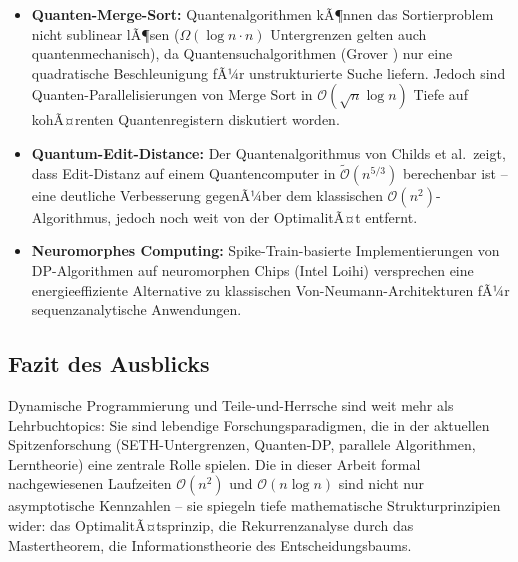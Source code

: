 ﻿\documentclass[a4paper,12pt]{article}
\theoremstyle{definition}
\begin{document}
\begin{itemize}
    \item \textbf{Quanten-Merge-Sort:} Quantenalgorithmen kÃ¶nnen das Sortierproblem
          nicht sublinear lÃ¶sen ($\Omega(\log n \cdot n)$ Untergrenzen gelten auch
          quantenmechanisch), da Quantensuchalgorithmen (Grover \cite{grover1996})
          nur eine quadratische Beschleunigung fÃ¼r unstrukturierte Suche liefern.
          Jedoch sind Quanten-Parallelisierungen von Merge Sort in
          $\mathcal{O}(\sqrt{n} \log n)$ Tiefe auf kohÃ¤renten Quantenregistern
          diskutiert worden.
    \item \textbf{Quantum-Edit-Distance:} Der Quantenalgorithmus von Childs et al.\
          zeigt, dass Edit-Distanz auf einem Quantencomputer in
          $\tilde{\mathcal{O}}(n^{5/3})$ berechenbar ist -- eine deutliche
          Verbesserung gegenÃ¼ber dem klassischen $\mathcal{O}(n^2)$-Algorithmus,
          jedoch noch weit von der OptimalitÃ¤t entfernt.
    \item \textbf{Neuromorphes Computing:} Spike-Train-basierte Implementierungen
          von DP-Algorithmen auf neuromorphen Chips (Intel Loihi) versprechen eine
          energieeffiziente Alternative zu klassischen Von-Neumann-Architekturen
          fÃ¼r sequenzanalytische Anwendungen.
\end{itemize}

\subsection{Fazit des Ausblicks}

Dynamische Programmierung und Teile-und-Herrsche sind weit mehr als Lehrbuchtopics:
Sie sind lebendige Forschungsparadigmen, die in der aktuellen Spitzenforschung
(SETH-Untergrenzen, Quanten-DP, parallele Algorithmen, Lerntheorie) eine zentrale
Rolle spielen. Die in dieser Arbeit formal nachgewiesenen Laufzeiten $\mathcal{O}(n^2)$
und $\mathcal{O}(n \log n)$ sind nicht nur asymptotische Kennzahlen -- sie spiegeln
tiefe mathematische Strukturprinzipien wider: das OptimalitÃ¤tsprinzip, die
Rekurrenzanalyse durch das Mastertheorem, die Informationstheorie des Entscheidungsbaums.
\end{document}
